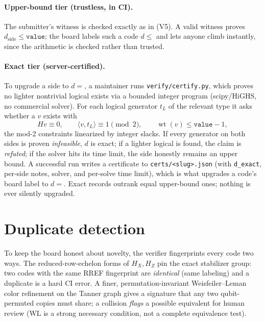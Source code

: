 \documentclass[11pt]{article}
\newcommand{\HX}{H_X}
\newcommand{\HZ}{H_Z}
\newcommand{\wt}{\operatorname{wt}}
\begin{document}
	\paragraph{Upper-bound tier (trustless, in CI).} The submitter's witness is
	checked exactly as in (V5). A valid witness proves $d_{\text{side}}\le
	\texttt{value}$; the board labels such a code $d\le$ and lets anyone climb
	instantly, since the arithmetic is checked rather than trusted.

	\paragraph{Exact tier (server-certified).} To upgrade a side to $d=$, a
	maintainer runs \texttt{verify/certify.py}, which proves no lighter
	nontrivial logical exists via a bounded integer program (scipy/HiGHS, no
	commercial solver). For each logical generator $t_L$ of the relevant type it
	asks whether a $v$ exists with
	\begin{equation}
		H v \equiv 0,\qquad \langle v,t_L\rangle\equiv 1 \pmod 2,\qquad
		\wt(v)\le \texttt{value}-1,
		\label{eq:milp}
	\end{equation}
	the mod-2 constraints linearized by integer slacks. If every generator on
	both sides is proven \emph{infeasible}, $d$ is exact; if a lighter logical
	is found, the claim is \emph{refuted}; if the solver hits its time limit, the
	side honestly remains an upper bound. A successful run writes a certificate
	to \texttt{certs/<slug>.json} (with \texttt{d\_exact}, per-side notes, solver,
	and per-solve time limit), which is what upgrades a code's board label to
	$d=$. Exact records outrank equal upper-bound ones; nothing is ever silently
	upgraded.

	\section{Duplicate detection}

	To keep the board honest about novelty, the verifier fingerprints every
	code two ways. The reduced-row-echelon forms of $\HX,\HZ$ pin the exact
	stabilizer group: two codes with the same RREF fingerprint are
	\emph{identical} (same labeling) and a duplicate is a hard CI error. A
	finer, permutation-invariant Weisfeiler--Leman color refinement on the
	Tanner graph gives a signature that any two qubit-permuted copies must
	share; a collision \emph{flags} a possible equivalent for human review (WL
	is a strong necessary condition, not a complete equivalence test).
\end{document}
